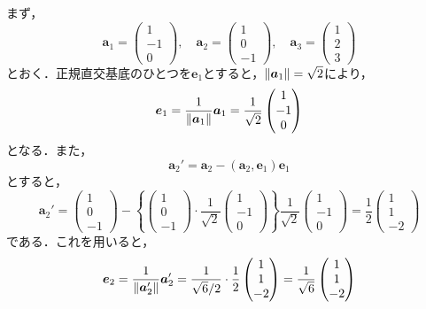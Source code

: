 \documentclass[a4paper,10pt,fleqn]{ltjsarticle}
\begin{document}
\begin{tleftbar}
  まず，
  \[
    \bm{a}_1 = \begin{pmatrix} 1 \\ -1 \\ 0 \end{pmatrix},\quad \bm{a}_2 =\begin{pmatrix} 1 \\ 0 \\ -1 \end{pmatrix},\quad \bm{a}_3 = \begin{pmatrix} 1 \\ 2 \\ 3 \end{pmatrix}
  \]
  とおく．正規直交基底のひとつを$\bm{e}_1$とすると，$\norm{\bm{a}_1}=\sqrt{2}$により，
  \[
    \bm{e}_1 = \frac{1}{\norm{\bm{a}_1}} \bm{a}_1 = \frac{1}{\sqrt{2}} \begin{pmatrix} 1 \\ -1 \\ 0 \end{pmatrix}
  \]
  となる．また，
  \[
    \bm{a}_2 ' = \bm{a}_2 - (\bm{a}_2,\bm{e}_1)\bm{e}_1
  \]
  とすると，
  \[
    \bm{a}_2 ' = \begin{pmatrix} 1 \\ 0 \\ -1 \end{pmatrix}-\left \{ \begin{pmatrix} 1 \\ 0 \\ -1 \end{pmatrix} \cdot \frac{1}{\sqrt{2}} \begin{pmatrix} 1 \\ -1 \\ 0 \end{pmatrix} \right \} \frac{1}{\sqrt{2}} \begin{pmatrix} 1 \\ -1 \\ 0 \end{pmatrix} =\frac{1}{2} \begin{pmatrix} 1 \\ 1\\ -2 \end{pmatrix}
  \]
  である．これを用いると，
  \[
    \bm{e}_2 = \frac{1}{\norm{\bm{a}_2'}} \bm{a}_2 ' =\frac{1}{\sqrt{6}/2} \cdot \frac{1}{2} \begin{pmatrix} 1 \\ 1\\ -2 \end{pmatrix} = \frac{1}{\sqrt{6}} \begin{pmatrix} 1 \\ 1\\ -2 \end{pmatrix}
\]
\end{tleftbar}
\end{document}
